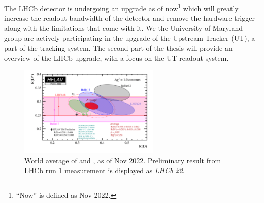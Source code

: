 The LHCb detector is undergoing an upgrade as of now\footnote{
    ``Now'' is defined as Nov 2022.
} which will greatly increase
the readout bandwidth of the detector and remove the hardware trigger along with
the limitations that come with it.
We the University of Maryland group are actively participating in the upgrade
of the Upstream Tracker (UT), a part of the tracking system.
The second part of the thesis will provide an overview of the LHCb upgrade, with
a focus on the UT readout system.

\begin{figure}[htb]
    \centering
    \includegraphics[width=0.6\textwidth]{./figs-intro/hflav_2022_preliminary.png}
    \caption{
        World average of \RD and \RDst, as of Nov 2022.
        Preliminary result from LHCb run 1 measurement is displayed as
        \emph{LHCb 22}.
    }
    \label{fig:hflav}
\end{figure}

